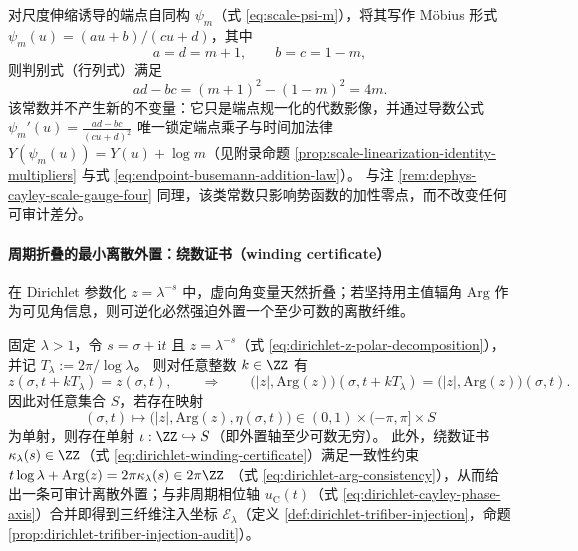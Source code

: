 \begin{remark}\label{rem:dephys-psi-discriminant-locks-time}
对尺度伸缩诱导的端点自同构 \(\psi_m\)（式 \eqref{eq:scale-psi-m}），将其写作 Möbius 形式 \(\psi_m(u)=(au+b)/(cu+d)\)，其中
\[
a=d=m+1,\qquad b=c=1-m,
\]
则判别式（行列式）满足
\[
\boxed{\;ad-bc=(m+1)^2-(1-m)^2=4m.\;}
\]
该常数并不产生新的不变量：它只是端点规一化的代数影像，并通过导数公式
\(
\psi_m'(u)=\frac{ad-bc}{(cu+d)^2}
\)
唯一锁定端点乘子与时间加法律 \(Y(\psi_m(u))=Y(u)+\log m\)（见附录命题 \ref{prop:scale-linearization-identity-multipliers} 与式 \eqref{eq:endpoint-busemann-addition-law}）。
与注 \ref{rem:dephys-cayley-scale-gauge-four} 同理，该类常数只影响势函数的加性零点，而不改变任何可审计差分。
\end{remark}

\paragraph{周期折叠的最小离散外置：绕数证书（winding certificate）}
在 Dirichlet 参数化 \(z=\lambda^{-s}\) 中，虚向角变量天然折叠；若坚持用主值辐角 \(\mathrm{Arg}\) 作为可见角信息，则可逆化必然强迫外置一个至少可数的离散纤维。

\begin{theorem}\label{thm:dephys-dirichlet-winding-minimal}
固定 \(\lambda>1\)，令 \(s=\sigma+\mathrm{i}t\) 且 \(z=\lambda^{-s}\)（式 \eqref{eq:dirichlet-z-polar-decomposition}），并记 \(T_{\lambda}:=2\pi/\log\lambda\)。
则对任意整数 \(k\in\ZZ\) 有
\[
z(\sigma,t+kT_{\lambda})=z(\sigma,t),
\qquad\Longrightarrow\qquad
\bigl(|z|,\mathrm{Arg}(z)\bigr)(\sigma,t+kT_{\lambda})=\bigl(|z|,\mathrm{Arg}(z)\bigr)(\sigma,t).
\]
因此对任意集合 \(S\)，若存在映射
\[
(\sigma,t)\longmapsto \bigl(|z|,\mathrm{Arg}(z),\eta(\sigma,t)\bigr)\in (0,1)\times(-\pi,\pi]\times S
\]
为单射，则存在单射 \(\iota:\ZZ\hookrightarrow S\)（即外置轴至少可数无穷）。
此外，绕数证书 \(\kappa_{\lambda}(s)\in\ZZ\)（式 \eqref{eq:dirichlet-winding-certificate}）满足一致性约束
\(
t\log\lambda+\mathrm{Arg}(z)=2\pi\kappa_{\lambda}(s)\in 2\pi\ZZ
\)
（式 \eqref{eq:dirichlet-arg-consistency}），从而给出一条可审计离散外置；与非周期相位轴 \(u_{\mathrm C}(t)\)（式 \eqref{eq:dirichlet-cayley-phase-axis}）合并即得到三纤维注入坐标 \(\mathcal{E}_{\lambda}\)（定义 \ref{def:dirichlet-trifiber-injection}，命题 \ref{prop:dirichlet-trifiber-injection-audit}）。
\end{theorem}

